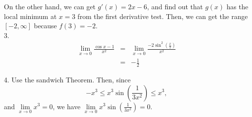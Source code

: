 \documentclass[11pt]{article}
\begin{document}
On the other hand, we can get $g'(x)=2x-6$, and find out that $g(x)$ has the local minimum at $x=3$ from the first derivative test. Then, we can get the range $[-2,\infty]$ because $f(3)=-2$.\\


3. \begin{eqnarray*}
\lim\limits_{x\rightarrow 0}\frac{\cos x-1}{x^2} & = & \lim\limits_{x\rightarrow 0}\frac{-2\sin^2(\frac{x}{2})}{x^2}\\
&=& -\frac{1}{2}
\end{eqnarray*}


4. Use the sandwich Theorem. Then, since $$-x^3\leq x^3\sin(\frac{1}{3x^2})\leq x^3,$$
and $\lim\limits_{x\rightarrow 0}x^3=0$, we have $\lim\limits_{x\rightarrow 0}x^3\sin(\frac{1}{3x^2})=0$.
\end{document}
